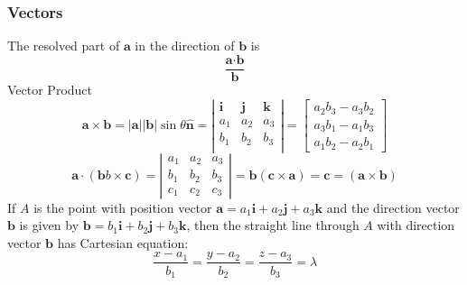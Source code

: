 \documentclass{book}
\begin{document}
            \subsubsection{Vectors}
            The resolved part of $\textbf{a}$ in the direction of $\textbf{b}$ is
            \begin{equation}
                \frac{\textbf{a}\cdot\textbf{b}}{\textbf{b}}
            \end{equation}
            Vector Product
            \begin{equation}
                \textbf{a}\times\textbf{b}=|\textbf{a}||\textbf{b}|\sin\theta\hat{\textbf{n}}=\left|
                    \begin{matrix}
                        \textbf{i} & \textbf{j} & \textbf{k} \\
                        a_1 & a_2 & a_3 \\
                        b_1 & b_2 & b_3 \\
                    \end{matrix}
                \right|=
                \begin{bmatrix}
                    a_2b_3-a_3b_2 \\
                    a_3b_1-a_1b_3 \\
                    a_1b_2-a_2b_1
                \end{bmatrix}
            \end{equation}
            \begin{equation}
                \textbf{a}\cdot(\textbf{b}b\times\textbf{c})=\left|
                    \begin{matrix}
                        a_1 & a_2 & a_3 \\
                        b_1 & b_2 & b_3 \\
                        c_1 & c_2 & c_3
                    \end{matrix}
                \right|=\textbf{b}(\textbf{c}\times\textbf{a})=\textbf{c}=(\textbf{a}\times\textbf{b})
            \end{equation}
            If $A$ is the point with position vector $\textbf{a}=a_1\textbf{i}+a_2\textbf{j}+a_3\textbf{k}$ and the direction vector $\textbf{b}$ is given by $\textbf{b}=b_1\textbf{i}+b_2\textbf{j}+b_3\textbf{k}$, then the straight line through $A$ with direction vector $\textbf{b}$ has Cartesian equation:
            \begin{equation}
                \frac{x-a_1}{b_1}=\frac{y-a_2}{b_2}=\frac{z-a_3}{b_3}=\lambda
            \end{equation}
\end{document}
